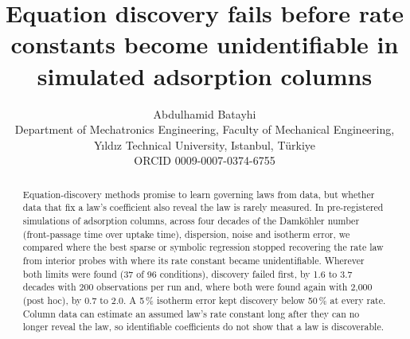 \documentclass[11pt]{article}
\title{Equation discovery fails before rate constants become unidentifiable in simulated adsorption columns}
\author{Abdulhamid Batayhi\\[4pt]
\small Department of Mechatronics Engineering, Faculty of Mechanical Engineering,\\
\small Y\i{}ld\i{}z Technical University, Istanbul, T\"urkiye\\[4pt]
\small ORCID 0009-0007-0374-6755}
\date{}
\begin{document}
\maketitle

\begin{abstract}
Equation-discovery methods promise to learn governing laws from data, but whether data that fix a law's
coefficient also reveal the law is rarely measured. In pre-registered simulations of adsorption columns, across four decades of the Damk\"ohler number (front-passage time over uptake time),
dispersion, noise and isotherm error, we compared where the best sparse or symbolic regression stopped recovering the rate law from interior probes with where its rate constant became unidentifiable. Wherever both limits were found (37 of 96 conditions), discovery failed first, by 1.6 to 3.7 decades with 200 observations per run and, where both were found again with
2,000 (post hoc), by 0.7 to 2.0. A 5\,\% isotherm error kept discovery below 50\,\% at every rate. Column data can
estimate an assumed law's rate constant long after they can no longer reveal the law, so identifiable
coefficients do not show that a law is discoverable.
\end{abstract}

\end{document}
